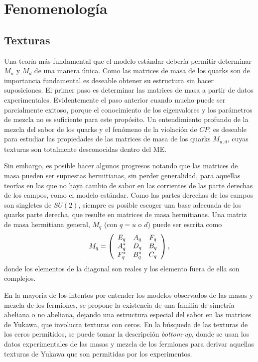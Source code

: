 \chapter{Fenomenolog\'ia}

\section{Texturas}
Una teor\'ia m\'as fundamental que el modelo est\'andar deber\'ia permitir 
determinar $M_u$ y $M_d$ de una manera \'unica. Como las matrices de masa de los
quarks son de importancia fundamental es deseable obtener su estructura sin 
hacer suposiciones. El primer paso es determinar las matrices de masa a partir 
de datos experimentales. Evidentemente el paso anterior cuando mucho puede ser 
parcialmente exitoso, porque el conocimiento de los eigenvalores y los 
par\'ametros de mezcla no es suficiente para este prop\'osito. Un entendimiento 
profundo de la mezcla del sabor de los quarks y el fen\'omeno de la violaci\'on 
de $CP$, es deseable para estudiar las propiedades de las matrices de masa de 
los quarks $M_{u,d}$, cuyas texturas son totalmente desconocidas dentro del ME. 

Sin embargo, es posible hacer algunos progresos notando que las matrices de masa
pueden ser supuestas hermitianas, sin perder generalidad, para aquellas 
teor\'ias en las que no haya cambio de sabor en las corrientes de las parte 
derechas de los campos, como el modelo est\'andar. Como las partes 
derechas de los campos son singletes de $SU(2)$, siempre es posible escoger una 
base adecuada de los quarks parte derecha, que resulte en matrices de masa 
hermitianas. Una matriz de masa hermitiana general, $M_q$ (con $q=u $ o $ d$)
puede ser escrita como
$$
M_q=\left(\ba{ccc} E_q&A_q&F_q\\ A^*_q&D_q&B_q\\ F^*_q&B^*_q&C_q\ea\right),
$$
donde los elementos de la diagonal son reales y los elemento fuera de ella son
complejos.

En la mayor\'ia de los intentos por entender los modelos observados de las masas
y mezcla de los fermiones, se propone la existencia de una familia de simetr\'ia
abeliana o no abeliana, dejando una estructura especial del sabor en las 
matrices de Yukawa, que involucra texturas con ceros. En la b\'usqueda de las 
texturas de los ceros permitidos, se puede tomar la descripci\'on 
{\it bottom-up}, donde se usan los datos experimentales de las masas y mezcla de
los fermiones para derivar aquellas texturas de Yukawa que son permitidas por 
los experimentos.  

